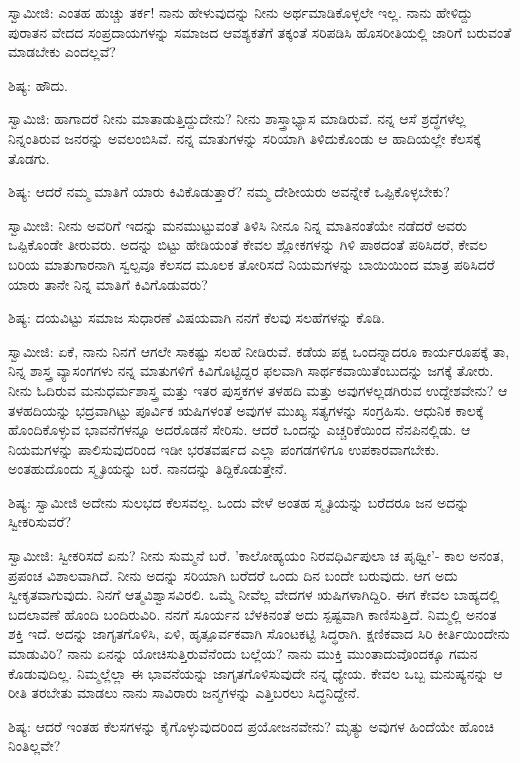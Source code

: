 ಸ್ವಾಮೀಜಿ: ಎಂತಹ ಹುಚ್ಚು ತರ್ಕ! ನಾನು ಹೇಳುವುದನ್ನು ನೀನು ಅರ್ಥಮಾಡಿಕೊಳ್ಳಲೇ ಇಲ್ಲ. ನಾನು ಹೇಳಿದ್ದು ಪುರಾತನ ವೇದದ ಸಂಪ್ರದಾಯಗಳನ್ನು ಸಮಾಜದ ಆವಶ್ಯಕತೆಗೆ ತಕ್ಕಂತೆ ಸರಿಪಡಿಸಿ ಹೊಸರೀತಿಯಲ್ಲಿ ಜಾರಿಗೆ ಬರುವಂತೆ ಮಾಡಬೇಕು ಎಂದಲ್ಲವೆ?

ಶಿಷ್ಯ: ಹೌದು.

ಸ್ವಾಮಿಜಿ: ಹಾಗಾದರೆ ನೀನು ಮಾತಾಡುತ್ತಿದ್ದುದೇನು? ನೀನು ಶಾಸ್ತ್ರಾಭ್ಯಾಸ ಮಾಡಿರುವೆ. ನನ್ನ ಆಸೆ ಶ್ರದ್ಧೆಗಳೆಲ್ಲ ನಿನ್ನಂತಿರುವ ಜನರನ್ನು ಅವಲಂಬಿಸಿವೆ. ನನ್ನ ಮಾತುಗಳನ್ನು ಸರಿಯಾಗಿ ತಿಳಿದುಕೊಂಡು ಆ ಹಾದಿಯಲ್ಲೇ ಕೆಲಸಕ್ಕೆ ತೊಡಗು.

ಶಿಷ್ಯ: ಆದರೆ ನಮ್ಮ ಮಾತಿಗೆ ಯಾರು ಕಿವಿಕೊಡುತ್ತಾರೆ? ನಮ್ಮ ದೇಶೀಯರು ಅವನ್ನೇಕೆ ಒಪ್ಪಿಕೊಳ್ಳಬೇಕು?

ಸ್ವಾಮೀಜಿ: ನೀನು ಅವರಿಗೆ ಇದನ್ನು ಮನಮುಟ್ಟುವಂತೆ ತಿಳಿಸಿ ನೀನೂ ನಿನ್ನ ಮಾತಿನಂತೆಯೇ ನಡೆದರೆ ಅವರು ಒಪ್ಪಿಕೊಂಡೇ ತೀರುವರು. ಅದನ್ನು ಬಿಟ್ಟು ಹೇಡಿಯಂತೆ ಕೇವಲ ಶ್ಲೋಕಗಳನ್ನು ಗಿಳಿ ಪಾಠದಂತೆ ಪಠಿಸಿದರೆ, ಕೇವಲ ಬರಿಯ ಮಾತುಗಾರನಾಗಿ ಸ್ವಲ್ಪವೂ ಕೆಲಸದ ಮೂಲಕ ತೋರಿಸದೆ ನಿಯಮಗಳನ್ನು ಬಾಯಿಯಿಂದ ಮಾತ್ರ ಪಠಿಸಿದರೆ ಯಾರು ತಾನೇ ನಿನ್ನ ಮಾತಿಗೆ ಕಿವಿಗೊಡುವರು?

ಶಿಷ್ಯ: ದಯವಿಟ್ಟು ಸಮಾಜ ಸುಧಾರಣೆ ವಿಷಯವಾಗಿ ನನಗೆ ಕೆಲವು ಸಲಹೆಗಳನ್ನು ಕೊಡಿ.

ಸ್ವಾಮೀಜಿ: ಏಕೆ, ನಾನು ನಿನಗೆ ಆಗಲೇ ಸಾಕಷ್ಟು ಸಲಹೆ ನೀಡಿರುವೆ. ಕಡೆಯ ಪಕ್ಷ ಒಂದನ್ನಾದರೂ ಕಾರ್ಯರೂಪಕ್ಕೆ ತಾ, ನಿನ್ನ ಶಾಸ್ತ್ರ ವ್ಯಾಸಂಗಗಳು ನನ್ನ ಮಾತುಗಳಿಗೆ ಕಿವಿಗೊಟ್ಟಿದ್ದರ ಫಲವಾಗಿ ಸಾರ್ಥಕವಾಯಿತೆಂಬುದನ್ನು ಜಗಕ್ಕೆ ತೋರು. ನೀನು ಓದಿರುವ ಮನುಧರ್ಮಶಾಸ್ತ್ರ ಮತ್ತು ಇತರ ಪುಸ್ತಕಗಳ ತಳಹದಿ ಮತ್ತು ಅವುಗಳಲ್ಲಡಗಿರುವ ಉದ್ದೇಶವೇನು? ಆ ತಳಹದಿಯನ್ನು ಭದ್ರವಾಗಿಟ್ಟು ಪೂರ್ವಿಕ ಋಷಿಗಳಂತೆ ಅವುಗಳ ಮುಖ್ಯ ಸತ್ಯಗಳನ್ನು ಸಂಗ್ರಹಿಸು. ಆಧುನಿಕ ಕಾಲಕ್ಕೆ ಹೊಂದಿಕೊಳ್ಳುವ ಭಾವನೆಗಳನ್ನೂ ಅದರೊಡನೆ ಸೇರಿಸು. ಆದರೆ ಒಂದನ್ನು ಎಚ್ಚರಿಕೆಯಿಂದ ನೆನಪಿನಲ್ಲಿಡು. ಆ ನಿಯಮಗಳನ್ನು ಪಾಲಿಸುವುದರಿಂದ ಇಡೀ ಭರತವರ್ಷದ ಎಲ್ಲಾ ಪಂಗಡಗಳಿಗೂ ಉಪಕಾರವಾಗಬೇಕು. ಅಂತಹುದೊಂದು ಸ್ಮೃತಿಯನ್ನು ಬರೆ. ನಾನದನ್ನು ತಿದ್ದಿಕೊಡುತ್ತೇನೆ.

ಶಿಷ್ಯ: ಸ್ವಾಮೀಜಿ ಅದೇನು ಸುಲಭದ ಕೆಲಸವಲ್ಲ. ಒಂದು ವೇಳೆ ಅಂತಹ ಸ್ಮೃತಿಯನ್ನು ಬರೆದರೂ ಜನ ಅದನ್ನು ಸ್ವೀಕರಿಸುವರೆ?

ಸ್ವಾಮೀಜಿ: ಸ್ವೀಕರಿಸದೆ ಏನು? ನೀನು ಸುಮ್ಮನೆ ಬರೆ. 'ಕಾಲೋಹ್ಯಯಂ ನಿರವಧಿರ್ವಿಪುಲಾ ಚ ಪೃಥ್ವೀ'- ಕಾಲ ಅನಂತ, ಪ್ರಪಂಚ ವಿಶಾಲವಾಗಿದೆ. ನೀನು ಅದನ್ನು ಸರಿಯಾಗಿ ಬರೆದರೆ ಒಂದು ದಿನ ಬಂದೇ ಬರುವುದು. ಆಗ ಅದು ಸ್ವೀಕೃತವಾಗುವುದು. ನಿನಗೆ ಆತ್ಮವಿಶ್ವಾಸವಿರಲಿ. ಒಮ್ಮೆ ನೀವೆಲ್ಲ ವೇದಗಳ ಋಷಿಗಳಾಗಿದ್ದಿರಿ. ಈಗ ಕೇವಲ ಬಾಹ್ಯದಲ್ಲಿ ಬದಲಾವಣೆ ಹೊಂದಿ ಬಂದಿರುವಿರಿ. ನನಗೆ ಸೂರ್ಯನ ಬೆಳಕಿನಂತೆ ಅದು ಸ್ಪಷ್ಟವಾಗಿ ಕಾಣಿಸುತ್ತಿದೆ. ನಿಮ್ಮಲ್ಲಿ ಅನಂತ ಶಕ್ತಿ ಇದೆ. ಅದನ್ನು ಜಾಗೃತಗೊಳಿಸಿ, ಏಳಿ, ಹೃತ್ಪೂರ್ವಕವಾಗಿ ಸೊಂಟಕಟ್ಟಿ ಸಿದ್ಧರಾಗಿ. ಕ್ಷಣಿಕವಾದ ಸಿರಿ ಕೀರ್ತಿಯಿಂದೇನು ಮಾಡುವಿರಿ? ನಾನು ಏನನ್ನು ಯೋಚಿಸುತ್ತಿರುವೆನೆಂದು ಬಲ್ಲೆಯ? ನಾನು ಮುಕ್ತಿ ಮುಂತಾದುವೊಂದಕ್ಕೂ ಗಮನ ಕೊಡುವುದಿಲ್ಲ. ನಿಮ್ಮಲ್ಲೆಲ್ಲಾ ಈ ಭಾವನೆಯನ್ನು ಜಾಗೃತಗೊಳಿಸುವುದೇ ನನ್ನ ಧ್ಯೇಯ. ಕೇವಲ ಒಬ್ಬ ಮನುಷ್ಯನನ್ನು ಆ ರೀತಿ ತರಬೇತು ಮಾಡಲು ನಾನು ಸಾವಿರಾರು ಜನ್ಮಗಳನ್ನು ಎತ್ತಿಬರಲು ಸಿದ್ಧನಿದ್ದೇನೆ.

ಶಿಷ್ಯ: ಆದರೆ ಇಂತಹ ಕೆಲಸಗಳನ್ನು ಕೈಗೊಳ್ಳುವುದರಿಂದ ಪ್ರಯೋಜನವೇನು? ಮೃತ್ಯು ಅವುಗಳ ಹಿಂದೆಯೇ ಹೊಂಚಿ ನಿಂತಿಲ್ಲವೇ?

